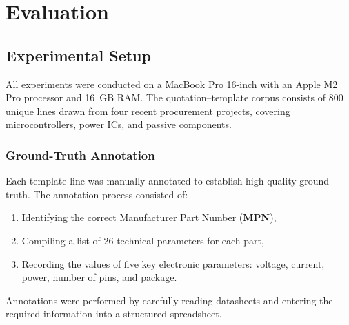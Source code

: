 \chapter{Evaluation}
\label{chapter:evaluation}

\section{Experimental Setup}
All experiments were conducted on a MacBook Pro 16-inch with an Apple M2 Pro processor and 16~GB RAM. The quotation–template corpus consists of 800 unique lines drawn from four recent procurement projects, covering microcontrollers, power ICs, and passive components.

\subsection{Ground-Truth Annotation}
Each template line was manually annotated to establish high-quality ground truth. The annotation process consisted of:
\begin{enumerate}
  \item Identifying the correct Manufacturer Part Number (\textbf{MPN}),
  \item Compiling a list of 26 technical parameters for each part,
  \item Recording the values of five key electronic parameters: voltage, current, power, number of pins, and package.
\end{enumerate}
Annotations were performed by carefully reading datasheets and entering the required information into a structured spreadsheet.

